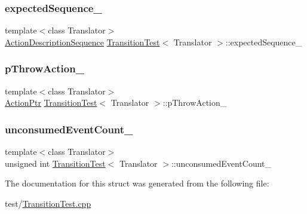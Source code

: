 \subsubsection{\texorpdfstring{expected\+Sequence\+\_\+}{expectedSequence\_}}
{\footnotesize\ttfamily template$<$class Translator$>$ \\
\mbox{\hyperlink{_transition_test_8cpp_a3a9d02400db74004cfbb7c1777a1e17a}{Action\+Description\+Sequence}} \mbox{\hyperlink{struct_transition_test}{Transition\+Test}}$<$ Translator $>$\+::expected\+Sequence\+\_\+\hspace{0.3cm}{\ttfamily [private]}}

\mbox{\label{struct_transition_test_a6008df970497b77425b4b0f0a45bb2f6}} 
\subsubsection{\texorpdfstring{p\+Throw\+Action\+\_\+}{pThrowAction\_}}
{\footnotesize\ttfamily template$<$class Translator$>$ \\
\mbox{\hyperlink{_transition_test_8cpp_a15abe0c263cd39ad777035499160b924}{Action\+Ptr}} \mbox{\hyperlink{struct_transition_test}{Transition\+Test}}$<$ Translator $>$\+::p\+Throw\+Action\+\_\+\hspace{0.3cm}{\ttfamily [private]}}

\mbox{\label{struct_transition_test_a69a4adaab96ad9695f9023243cf66ecb}} 
\subsubsection{\texorpdfstring{unconsumed\+Event\+Count\+\_\+}{unconsumedEventCount\_}}
{\footnotesize\ttfamily template$<$class Translator$>$ \\
unsigned int \mbox{\hyperlink{struct_transition_test}{Transition\+Test}}$<$ Translator $>$\+::unconsumed\+Event\+Count\+\_\+\hspace{0.3cm}{\ttfamily [private]}}



The documentation for this struct was generated from the following file\+:\begin{DoxyCompactItemize}
\item 
test/\mbox{\hyperlink{_transition_test_8cpp}{Transition\+Test.\+cpp}}\end{DoxyCompactItemize}
